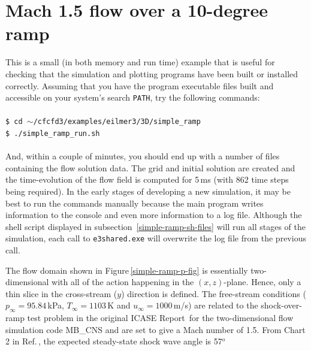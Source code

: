 
\section{Mach 1.5 flow over a 10-degree ramp}
\label{simple-ramp-sec}
%
This is a small (in both memory and run time) example 
that is useful for checking that the simulation and
plotting programs have been built or installed correctly.
Assuming that you have the program executable files built and
accessible on your system's search \texttt{PATH}, 
try the following commands:\\
%
\topbar\\
\texttt{\$ cd $\sim$/cfcfd3/examples/eilmer3/3D/simple\_ramp}\\
\texttt{\$ ./simple\_ramp\_run.sh}\\
\bottombar\\
%
And, within a couple of minutes, you should end up with a number of files
containing the flow solution data.
The grid and initial solution are created and the time-evolution of the
flow field is computed for 5\,ms (with 862 time steps being required).
In the early stages of developing a new simulation, it may be best to run the
commands manually because the main program writes information to the console
and even more information to a log file.
Although the shell script displayed in subsection~\ref{simple-ramp-sh-files}
will run all stages of the simulation, each call to \texttt{e3shared.exe}
will overwrite the log file from the previous call.

\medskip
The flow domain shown in Figure\,\ref{simple-ramp-p-fig} is essentially
two-dimensional with all of the action happening in the $(x,z)$-plane.
Hence, only a thin slice in the cross-stream ($y$) direction is defined.
The free-stream conditions ($p_{\infty} = 95.84$\,kPa, $T_{\infty} = 1103$\,K
and $u_{\infty} = 1000$\,m/s) are related to the shock-over-ramp test problem
in the original ICASE Report\,\cite{jacobs_91d} for the two-dimensional flow
simulation code MB\_CNS and are set to give a Mach number of 1.5.
From Chart 2 in Ref.\,\cite{ames_53}, the expected steady-state shock wave
angle is 57$^o$


